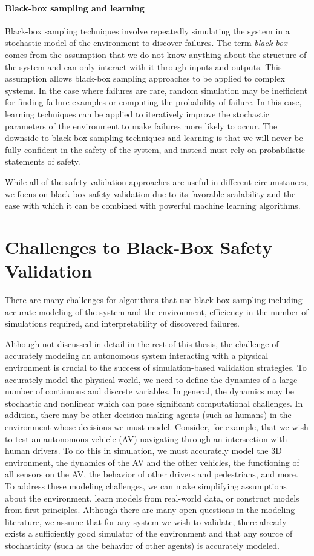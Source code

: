 \paragraph{Black-box sampling and learning} Black-box sampling techniques involve repeatedly simulating the system in a stochastic model of the environment to discover failures. The term \emph{black-box} comes from the assumption that we do not know anything about the structure of the system and can only interact with it through inputs and outputs. This assumption allows black-box sampling approaches to be applied to complex systems. In the case where failures are rare, random simulation may be inefficient for finding failure examples or computing the probability of failure. In this case, learning techniques can be applied to iteratively improve the stochastic parameters of the environment to make failures more likely to occur. The downside to black-box sampling techniques and learning is that we will never be fully confident in the safety of the system, and instead must rely on probabilistic statements of safety. 

While all of the safety validation approaches are useful in different circumstances, we focus on black-box safety validation due to its favorable scalability and the ease with which it can be combined with powerful machine learning algorithms.


\section{Challenges to Black-Box Safety Validation}
There are many challenges for algorithms that use black-box sampling including accurate modeling of the system and the environment, efficiency in the number of simulations required, and interpretability of discovered failures. 

Although not discussed in detail in the rest of this thesis, the challenge of accurately modeling an autonomous system interacting with a physical environment is crucial to the success of simulation-based validation strategies. To accurately model the physical world, we need to define the dynamics of a large number of continuous and discrete variables. In general, the dynamics may be stochastic and nonlinear which can pose significant computational challenges. In addition, there may be other decision-making agents (such as humans) in the environment whose decisions we must model. Consider, for example, that we wish to test an autonomous vehicle (AV) navigating through an intersection with human drivers. To do this in simulation, we must accurately model the 3D environment, the dynamics of the AV and the other vehicles, the functioning of all sensors on the AV, the behavior of other drivers and pedestrians, and more. To address these modeling challenges, we can make simplifying assumptions about the environment, learn models from real-world data, or construct models from first principles. Although there are many open questions in the modeling literature, we assume that for any system we wish to validate, there already exists a sufficiently good simulator of the environment and that any source of stochasticity (such as the behavior of other agents) is accurately modeled. 

